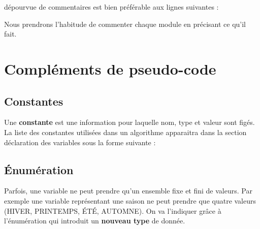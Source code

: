 
		dépourvue de commentaires est bien préférable aux lignes suivantes :

		
		Nous prendrons l'habitude de commenter chaque module en précisant ce qu'il fait.

	\section{Compléments de pseudo-code}


		\subsection{Constantes}

			Une \textbf{constante} est une information pour laquelle nom, type et
			valeur sont figés. La liste des constantes utilisées dans un algorithme
			apparaitra dans la section déclaration des variables sous la forme
			suivante :



		\subsection{Énumération}

			Parfois, une variable ne peut prendre qu'un ensemble
			fixe et fini de valeurs. Par exemple une variable représentant une
			saison ne peut prendre que quatre valeurs (HIVER, PRINTEMPS, ÉTÉ,
			AUTOMNE). On va l'indiquer grâce à
			l'énumération qui introduit un \textbf{nouveau type}
			de donnée.

